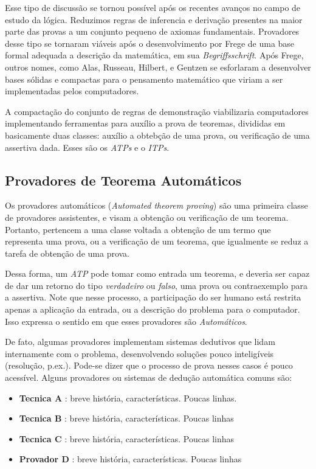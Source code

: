 Esse tipo de discussão se tornou possível após os recentes avanços no campo de estudo da lógica.
Reduzimos regras de inferencia e derivação presentes na maior parte das provas a um conjunto pequeno de axiomas fundamentais.
Provadores desse tipo se tornaram viáveis após o desenvolvimento por Frege de uma base formal adequada a descrição da matemática, em sua \textit{Begriffsschrift}.
Após Frege, outros nomes, como Alas, Russeau, Hilbert, e Gentzen se esforlaram a desenvolver bases sólidas e compactas para o pensamento matemático que viriam a ser implementadas pelos computadores.

A compactação do conjunto de regras de demonstração viabilizaria computadores implementando ferramentas para auxílio a prova de teoremas, divididas em basicamente duas classes: auxílio a obtebção de uma prova, ou verificação de uma assertiva dada. Esses são os \textit{ATPs} e o \textit{ITPs}.

\subsection{Provadores de Teorema Automáticos}
Os provadores automáticos (\textit{Automated theorem proving}) são uma primeira classe de provadores assistentes, e visam a obtenção ou verificação de um teorema.
Portanto, pertencem a uma classe voltada a obtenção de um termo que representa uma prova, ou a verificação de um teorema, que igualmente se reduz a tarefa de obtenção de uma prova.

Dessa forma, um \textit{ATP} pode tomar como entrada um teorema, e deveria ser capaz de dar um retorno do tipo \textit{verdadeiro} ou \textit{falso}, uma prova ou contraexemplo para a assertiva.
Note que nesse processo, a participação do ser humano está restrita apenas a aplicação da entrada, ou a descrição do problema para o computador.
Isso expressa o sentido em que esses provadores são \textit{Automáticos}.

De fato, algumas provadores implementam sistemas dedutivos que lidam internamente com o problema, desenvolvendo soluções pouco inteligíveis (resolução, p.ex.).
Pode-se dizer que o processo de prova nesses casos é pouco acessível.
Alguns provadores ou sistemas de dedução automática comuns são:

\begin{itemize}
    \item \textbf{Tecnica A} : breve história, características. Poucas linhas.
    \item \textbf{Tecnica B} : breve história, características. Poucas linhas
    \item \textbf{Tecnica C} : breve história, características. Poucas linhas
    \item \textbf{Provador D} : breve história, características. Poucas linhas
\end{itemize}

